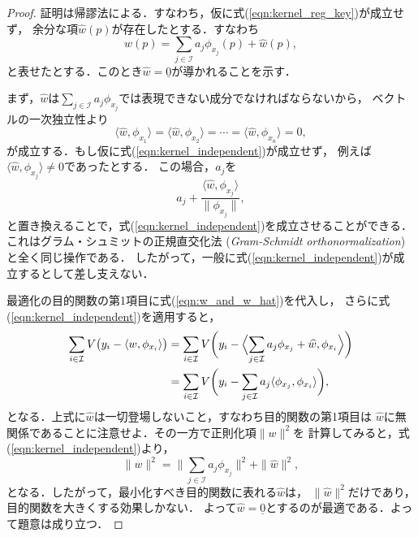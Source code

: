 \begin{proof}
証明は帰謬法による．すなわち，仮に式(\ref{eqn:kernel_reg_key})が成立せず，
余分な項$\widehat{w}(p)$が存在したとする．すなわち
\begin{equation}
\label{eqn:w_and_w_hat}
w(p) = \sum_{j \in \mathcal{I}} a_j \phi_{x_j}(p) + \widehat{w}(p),
\end{equation}
と表せたとする．このとき$\widehat{w} = \underline{0}$が導かれることを示す．

まず，$\widehat{w}$は$\sum_{j \in \mathcal{I}} a_j \phi_{x_j}$では表現できない成分でなければならないから，
ベクトルの一次独立性より
\begin{equation}
\label{eqn:kernel_independent}
  \langle \widehat{w}, \phi_{x_1} \rangle
= \langle \widehat{w}, \phi_{x_2} \rangle
= \cdots
= \langle \widehat{w}, \phi_{x_n} \rangle
= 0,
\end{equation}
が成立する．もし仮に式(\ref{eqn:kernel_independent})が成立せず，
例えば$\langle \widehat{w}, \phi_{x_j} \rangle \neq 0$であったとする．
この場合，$a_j$を
\begin{equation}
a_j + \frac{\langle \widehat{w}, \phi_{x_j} \rangle}{\| \phi_{x_j} \|},
\end{equation}
と置き換えることで，式(\ref{eqn:kernel_independent})を成立させることができる．
これはグラム・シュミットの正規直交化法 (\textit{Gram-Schmidt orthonormalization}) と全く同じ操作である．
したがって，一般に式(\ref{eqn:kernel_independent})が成立するとして差し支えない．

最適化の目的関数の第1項目に式(\ref{eqn:w_and_w_hat})を代入し，
さらに式(\ref{eqn:kernel_independent})を適用すると，
\begin{align*}
\sum_{i \in \mathcal{I}} V \bigl( y_i - \langle w, \phi_{x_i} \rangle \bigr)
&= \sum_{i \in \mathcal{I}} V \biggl( y_i - \Bigl\langle \sum_{j \in \mathcal{I}} a_j 
\phi_{x_j} + \widehat{w}, \phi_{x_i} \Bigr\rangle \biggr) \\
&= \sum_{i \in \mathcal{I}} V \biggl( y_i - \sum_{j \in \mathcal{I}}
a_j \langle \phi_{x_j}, \phi_{x_i} \rangle \biggr),
\end{align*}
となる．上式に$\widehat{w}$は一切登場しないこと，すなわち目的関数の第1項目は
$\widehat{w}$に無関係であることに注意せよ．その一方で正則化項$\| w \|^2$を
計算してみると，式(\ref{eqn:kernel_independent})より，
\begin{equation}
\| w \|^2 = \biggl\| \sum_{j \in \mathcal{I}} a_j \phi_{x_j} \biggr\|^2 + \| \widehat{w} \|^2,
\end{equation}
となる．したがって，最小化すべき目的関数に表れる$\widehat{w}$は，
$\| \widehat{w} \|^2$だけであり，目的関数を大きくする効果しかない．
よって$\widehat{w} = \underline{0}$とするのが最適である．よって題意は成り立つ．
\end{proof}

